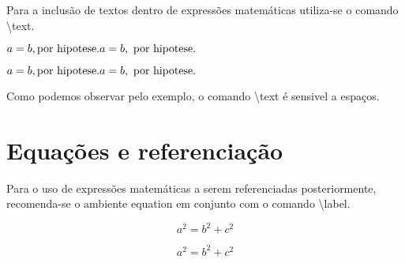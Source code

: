 Para a inclusão de textos dentro de expressões matemáticas utiliza-se o comando \textbackslash\textsf{text}. \\
\begin{minipage}[t]{0.47\linewidth} \vspace{-8pt}
    \begin{latexcode}
        $a = b,\text{por hipotese.} \\
        a = b,\text{ por hipotese.}$
    \end{latexcode}
\end{minipage} \hfill
\begin{minipage}[t]{0.47\linewidth} \vspace{0pt}
    $a = b,\text{por hipotese.} \\
    a = b,\text{ por hipotese.}$
\end{minipage}
Como podemos observar pelo exemplo, o comando \textbackslash\textsf{text} é sensivel a espaços.

\section{Equações e referenciação} \label{sse:latex:equation}
Para o uso de expressões matemáticas a serem referenciadas posteriormente, recomenda-se o ambiente \textsf{equation} em conjunto com o comando \textbackslash\textsf{label}. \\
\begin{minipage}[t]{0.47\linewidth} \vspace{-8pt}
    \begin{latexcode}
        \begin{equation}\label{E:TeoPit}
            a^2 = b^2 + c^2
        \end{equation}
    \end{latexcode}
\end{minipage} \hfill
\begin{minipage}[t]{0.47\linewidth} \vspace{0pt}
    \begin{equation}\label{E:TeoPit}
        a^2 = b^2 + c^2
    \end{equation}
\end{minipage}

